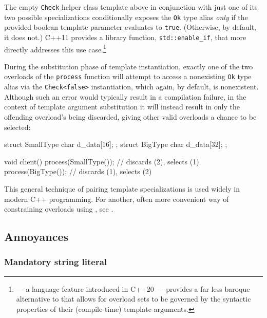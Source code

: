 \noindent The empty \lstinline!Check! helper class template above in conjunction with
just one of its two possible specializations conditionally
exposes the \lstinline!Ok! type alias \emph{only} if the provided boolean
template parameter evaluates to \lstinline!true!. (Otherwise, by default, it
does not.) C++11 provides a library function, \lstinline!std::enable_if!, that more directly addresses this use case.\footnote{ --- a
language feature introduced in C++20 --- provides a far less baroque
alternative to  that allows for overload sets to be governed by
  the syntactic properties of their (compile-time) template arguments.}

During the substitution phase of template instantiation,
exactly one of the two overloads of the \lstinline!process! function will
attempt to access a nonexisting \lstinline!Ok! type alias via the
\lstinline!Check<false>! instantiation, which again, by default, is
nonexistent. Although such an error would typically result in a
compilation failure, in the context of template argument substitution it
will instead result in only the offending overload's being discarded,
giving other valid overloads a chance to be selected:

\begin{emcppshiddenlisting}[emcppsbatch=e6]
struct SmallType { char d_data[16]; };
struct BigType   { char d_data[32]; };
\end{emcppshiddenlisting}
\begin{emcppslisting}[emcppsbatch=e6]
void client()
{
    process(SmallType());  // discards (2), selects (1)
    process(BigType());    // discards (1), selects (2)
}
\end{emcppslisting}

\noindent This general technique of pairing template specializations is used widely
in modern C++ programming. For another, often more convenient way of
constraining overloads using , see
.

\subsection[Annoyances]{Annoyances}\label{static-annoyances}

\subsubsection[Mandatory string literal]{Mandatory string literal}\label{mandatory-string-literal}

